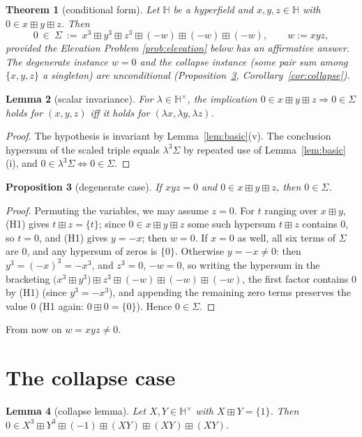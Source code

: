 \documentclass[11pt]{article}
\newtheorem{theorem}{Theorem}[section]
\newtheorem{lemma}[theorem]{Lemma}
\newtheorem{proposition}[theorem]{Proposition}
\theoremstyle{definition}
\theoremstyle{remark}
\newcommand{\Hb}{\mathbb{H}}
\newcommand{\bp}{\boxplus}
\begin{document}
\begin{theorem}[conditional form]\label{thm:main}
Let $\Hb$ be a hyperfield and $x,y,z\in\Hb$ with $0\in x\bp y\bp z$. Then
\[
  0\ \in\ \Sigma\ :=\
   x^3\bp y^3\bp z^3\bp(-w)\bp(-w)\bp(-w),\qquad w:=xyz,
\]
provided the Elevation Problem \ref{prob:elevation} below has an
affirmative answer. The degenerate instance $w=0$ and the collapse
instance (some pair sum among $\{x,y,z\}$ a singleton) are unconditional
(Proposition~\ref{prop:degen}, Corollary~\ref{cor:collapse}).
\end{theorem}

\begin{lemma}[scalar invariance]\label{lem:scale}
For $\lambda\in\Hb^\times$, the implication
$0\in x\bp y\bp z\Rightarrow0\in\Sigma$ holds for $(x,y,z)$ iff it holds
for $(\lambda x,\lambda y,\lambda z)$.
\end{lemma}
\begin{proof}
The hypothesis is invariant by Lemma~\ref{lem:basic}(v). The conclusion
hypersum of the scaled triple equals $\lambda^3\Sigma$ by repeated use of
Lemma~\ref{lem:basic}(i), and $0\in\lambda^3\Sigma\iff0\in\Sigma$.
\end{proof}

\begin{proposition}[degenerate case]\label{prop:degen}
If $xyz=0$ and $0\in x\bp y\bp z$, then $0\in\Sigma$.
\end{proposition}
\begin{proof}
Permuting the variables, we may assume $z=0$. For $t$ ranging over
$x\bp y$, (H1) gives $t\bp z=\{t\}$; since $0\in x\bp y\bp z$ some such
hypersum $t\bp z$ contains $0$, so $t=0$, and (H1) gives $y=-x$; then
$w=0$. If $x=0$ as well, all six terms of $\Sigma$ are $0$, and any
hypersum of zeros is $\{0\}$. Otherwise $y=-x\neq0$: then
$y^3=(-x)^3=-x^3$, and $z^3=0$, $-w=0$, so writing the hypersum in the
bracketing $\bigl(x^3\bp y^3\bigr)\bp z^3\bp(-w)\bp(-w)\bp(-w)$, the
first factor contains $0$ by (H1) (since $y^3=-x^3$), and appending the
remaining zero terms preserves the value $0$ (H1 again:
$0\bp0=\{0\}$). Hence $0\in\Sigma$.
\end{proof}

From now on $w=xyz\neq0$.

\section{The collapse case}\label{sec:collapse}

\begin{lemma}[collapse lemma]\label{lem:collapse}
Let $X,Y\in\Hb^\times$ with $X\bp Y=\{1\}$. Then
$0\in X^3\bp Y^3\bp(-1)\bp(XY)\bp(XY)\bp(XY)$.
\end{lemma}
\end{document}
